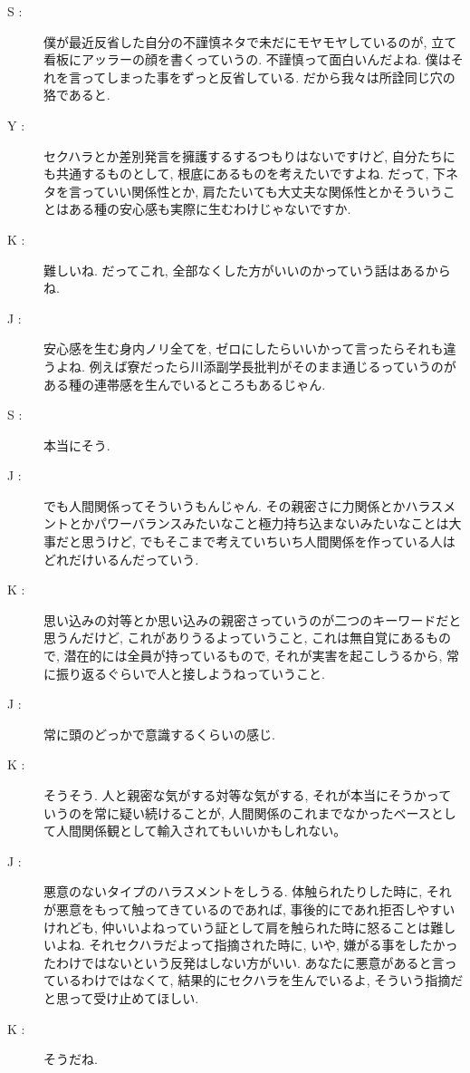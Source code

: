 \documentclass[10pt,b5jsbook,dvips,dvipdfmx,openany]{jsbook}
\theoremstyle{definition}
\begin{document}
\begin{multicols}{2}
\begin{description}
		\item[ S : ] 僕が最近反省した自分の不謹慎ネタで未だにモヤモヤしているのが, 立て看板にアッラーの顔を書くっていうの. 不謹慎って面白いんだよね. 僕はそれを言ってしまった事をずっと反省している. だから我々は所詮同じ穴の狢であると. 

		\item[ Y : ] セクハラとか差別発言を擁護するするつもりはないですけど, 自分たちにも共通するものとして, 根底にあるものを考えたいですよね. だって, 下ネタを言っていい関係性とか, 肩たたいても大丈夫な関係性とかそういうことはある種の安心感も実際に生むわけじゃないですか. 

		\item[ K : ] 難しいね. だってこれ, 全部なくした方がいいのかっていう話はあるからね. 

		\item[ J : ] 安心感を生む身内ノリ全てを, ゼロにしたらいいかって言ったらそれも違うよね. 例えば寮だったら川添副学長批判がそのまま通じるっていうのがある種の連帯感を生んでいるところもあるじゃん. 

		\item[ S : ] 本当にそう. 

		\item[ J : ] でも人間関係ってそういうもんじゃん. その親密さに力関係とかハラスメントとかパワーバランスみたいなこと極力持ち込まないみたいなことは大事だと思うけど, でもそこまで考えていちいち人間関係を作っている人はどれだけいるんだっていう. 

		\item[ K : ] 思い込みの対等とか思い込みの親密さっていうのが二つのキーワードだと思うんだけど, これがありうるよっていうこと, これは無自覚にあるもので, 潜在的には全員が持っているもので, それが実害を起こしうるから, 常に振り返るぐらいで人と接しようねっていうこと. 

		\item[ J : ] 常に頭のどっかで意識するくらいの感じ. 

		\item[ K : ] そうそう. 人と親密な気がする対等な気がする, それが本当にそうかっていうのを常に疑い続けることが, 人間関係のこれまでなかったベースとして人間関係観として輸入されてもいいかもしれない｡

		\item[ J : ] 悪意のないタイプのハラスメントをしうる. 体触られたりした時に, それが悪意をもって触ってきているのであれば, 事後的にであれ拒否しやすいけれども, 仲いいよねっていう証として肩を触られた時に怒ることは難しいよね. それセクハラだよって指摘された時に, いや, 嫌がる事をしたかったわけではないという反発はしない方がいい. あなたに悪意があると言っているわけではなくて, 結果的にセクハラを生んでいるよ, そういう指摘だと思って受け止めてほしい. 

		\item[ K : ] そうだね. 

		\end{description}
		\end{multicols}
\end{document}
